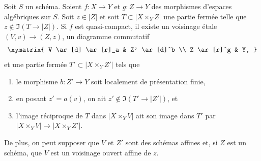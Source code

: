\begin{lemma}
\label{lemma-separate}
Soit $S$ un schéma. Soient $f : X \to Y$ et $g : Z \to Y$ des
morphismes d'espaces algébriques sur $S$. Soit $z \in |Z|$ et soit
$T \subset |X \times_Y Z|$ une partie fermée
telle que $z \not \in \Im(T \to |Z|)$.
Si $f$ est quasi-compact, il existe
un voisinage \'etale $(V, v) \to (Z, z)$,
un diagramme commutatif
$$
\xymatrix{
V \ar[d] \ar[r]_a & Z' \ar[d]^b \\
Z \ar[r]^g & Y,
}
$$
et une partie fermée $T' \subset |X \times_Y Z'|$ tels que
\begin{enumerate}
\item le morphisme $b : Z' \to Y$ soit localement de présentation finie,
\item en posant $z' = a(v)$, on ait $z' \not \in \Im(T' \to |Z'|)$, et
\item l'image réciproque de $T$ dans $|X \times_Y V|$
ait son image dans $T'$ par $|X \times_Y V| \to |X \times_Y Z'|$.
\end{enumerate}
De plus, on peut supposer que $V$ et $Z'$ sont des schémas affines et, si $Z$
est un schéma, que $V$ est un voisinage ouvert affine de $z$.
\end{lemma}

